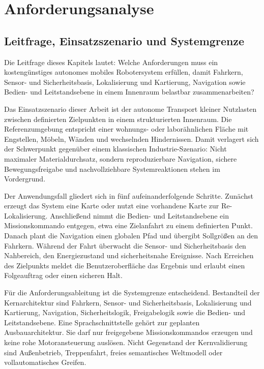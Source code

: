 \chapter{Anforderungsanalyse}

\section{Leitfrage, Einsatzszenario und Systemgrenze}

Die Leitfrage dieses Kapitels lautet: Welche Anforderungen muss ein kostengünstiges autonomes mobiles Robotersystem erfüllen, damit Fahrkern, Sensor- und Sicherheitsbasis, Lokalisierung und Kartierung, Navigation sowie Bedien- und Leitstandsebene in einem Innenraum belastbar zusammenarbeiten?

Das Einsatzszenario dieser Arbeit ist der autonome Transport kleiner Nutzlasten zwischen definierten Zielpunkten in einem strukturierten Innenraum. Die Referenzumgebung entspricht einer wohnungs- oder laborähnlichen Fläche mit Engstellen, Möbeln, Wänden und wechselnden Hindernissen. Damit verlagert sich der Schwerpunkt gegenüber einem klassischen Industrie-Szenario: Nicht maximaler Materialdurchsatz, sondern reproduzierbare Navigation, sichere Bewegungsfreigabe und nachvollziehbare Systemreaktionen stehen im Vordergrund.

Der Anwendungsfall gliedert sich in fünf aufeinanderfolgende Schritte. Zunächst erzeugt das System eine Karte oder nutzt eine vorhandene Karte zur Re-Lokalisierung. Anschließend nimmt die Bedien- und Leitstandsebene ein Missionskommando entgegen, etwa eine Zielanfahrt zu einem definierten Punkt. Danach plant die Navigation einen globalen Pfad und übergibt Sollgrößen an den Fahrkern. Während der Fahrt überwacht die Sensor- und Sicherheitsbasis den Nahbereich, den Energiezustand und sicherheitsnahe Ereignisse. Nach Erreichen des Zielpunkts meldet die Benutzeroberfläche das Ergebnis und erlaubt einen Folgeauftrag oder einen sicheren Halt.

Für die Anforderungsableitung ist die Systemgrenze entscheidend. Bestandteil der Kernarchitektur sind Fahrkern, Sensor- und Sicherheitsbasis, Lokalisierung und Kartierung, Navigation, Sicherheitslogik, Freigabelogik sowie die Bedien- und Leitstandsebene. Eine Sprachschnittstelle gehört zur geplanten Ausbauarchitektur. Sie darf nur freigegebene Missionskommandos erzeugen und keine rohe Motoransteuerung auslösen. Nicht Gegenstand der Kernvalidierung sind Außenbetrieb, Treppenfahrt, freies semantisches Weltmodell oder vollautomatisches Greifen.

